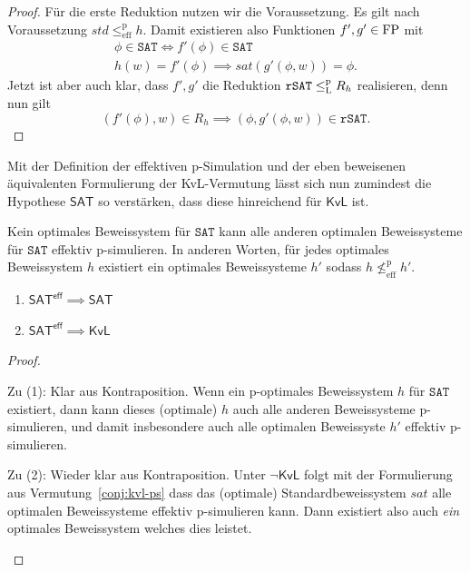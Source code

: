 \begin{proof}
    Für die erste Reduktion nutzen wir die Voraussetzung.
    Es gilt nach Voraussetzung $\mathit{std}\leq^\mathrm p_\mathrm{eff} h$. Damit existieren also Funktionen $f', g'\in \mathrm{FP}$ mit
    \begin{gather*}
        \phi\in\mathtt{SAT} \iff f'(\phi)\in\mathtt{SAT} \\
        h(w)=f'(\phi) \implies \mathit{sat}(g'(\phi, w)) = \phi.
    \end{gather*}
    Jetzt ist aber auch klar, dass $f', g'$ die Reduktion $\mathtt{rSAT}\leq_\mathrm{L}^\mathrm{p} R_h$ realisieren, denn nun gilt
    \[ (f'(\phi), w)\in R_h \implies (\phi, g'(\phi, w))\in \mathtt{rSAT}. \]
\end{proof}

Mit der Definition der effektiven p-Simulation und der eben beweisenen äquivalenten Formulierung der KvL-Vermutung lässt sich nun zumindest die Hypothese $\mathsf{SAT}$ so verstärken, dass diese hinreichend für $\mathsf{KvL}$ ist.


\begin{conjecture}
    Kein optimales Beweissystem für $\mathtt{SAT}$ kann alle anderen optimalen Beweissysteme für $\mathtt{SAT}$ effektiv p-simulieren.
    In anderen Worten, für jedes optimales Beweissystem $h$ existiert ein  optimales Beweissysteme $h'$ sodass $h\not\leq^\mathrm p_\mathrm{eff} h'$.
\end{conjecture}

\begin{theorem}\label{thm:sateff-generalizes-sat}
    \begin{enumerate}
        \item $\mathsf{SAT^{eff}}\implies \mathsf{SAT}$
        \item $\mathsf{SAT^{eff}}\implies \mathsf{KvL}$
    \end{enumerate}
\end{theorem}
\begin{proof}
\begin{prooflist}
\item Zu (1): Klar aus Kontraposition. Wenn ein p-optimales Beweissystem $h$ für $\mathtt{SAT}$ existiert, dann kann dieses (optimale) $h$ auch alle anderen Beweissysteme p-simulieren, und damit insbesondere auch alle optimalen Beweissyste $h'$ effektiv p-simulieren.

\item Zu (2): Wieder klar aus Kontraposition. Unter $\neg\mathsf{KvL}$ folgt mit der Formulierung aus Vermutung~\ref{conj:kvl-ps} dass das (optimale) Standardbeweissystem $\mathit{sat}$ alle optimalen Beweissysteme effektiv p-simulieren kann. Dann existiert also auch \emph{ein} optimales Beweissystem welches dies leistet.
\end{prooflist}
\end{proof}

